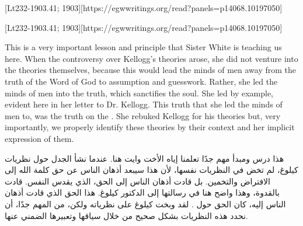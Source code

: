 [Lt232-1903.41; 1903][https://egwwritings.org/read?panels=p14068.10197050]


[Lt232-1903.41; 1903][https://egwwritings.org/read?panels=p14068.10197050]


This is a very important lesson and principle that Sister White is teaching us here. When the controversy over Kellogg’s theories arose, she did not venture into the theories themselves, because this would lead the minds of men away from the truth of the Word of God to assumption and guesswork. Rather, she led the minds of men into the truth, which sanctifies the soul. She led by example, evident here in her letter to Dr. Kellogg. This truth that she led the minds of men to, was the truth on the . She rebuked Kellogg for his theories but, very importantly, we properly identify these theories by their context and her implicit expression of them.


هذا درس ومبدأ مهم جدًا تعلمنا إياه الأخت وايت هنا. عندما نشأ الجدل حول نظريات كيلوغ، لم تخض في النظريات نفسها، لأن هذا سيبعد أذهان الناس عن حق كلمة الله إلى الافتراض والتخمين. بل قادت أذهان الناس إلى الحق، الذي يقدس النفس. قادت بالقدوة، وهذا واضح هنا في رسالتها إلى الدكتور كيلوغ. هذا الحق الذي قادت أذهان الناس إليه، كان الحق حول . لقد وبخت كيلوغ على نظرياته ولكن، من المهم جدًا، أن نحدد هذه النظريات بشكل صحيح من خلال سياقها وتعبيرها الضمني عنها.


